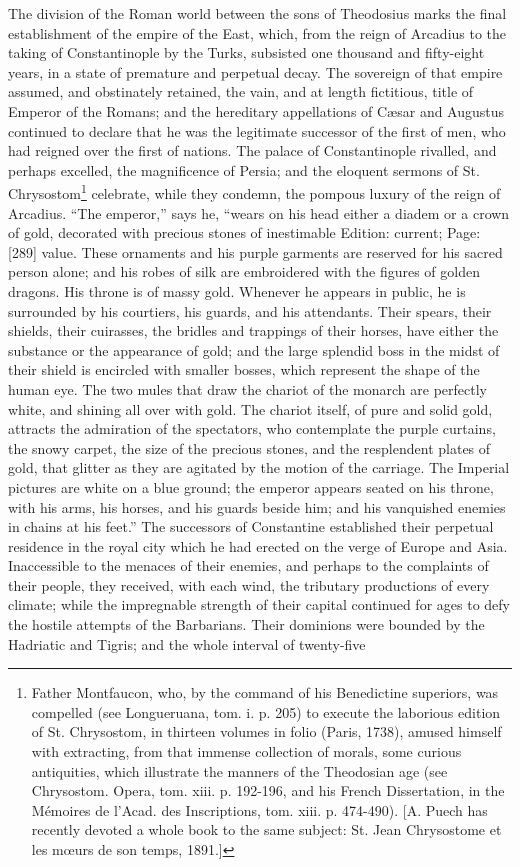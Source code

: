The division of the Roman world between the sons of Theodosius marks the final establishment of the empire of the East, which, from the reign of Arcadius to the taking of Constantinople by the Turks, subsisted one thousand and fifty-eight years, in a state of premature and perpetual decay. The sovereign of that empire assumed, and obstinately retained, the vain, and at length fictitious, title of Emperor of the Romans; and the hereditary appellations of Cæsar and Augustus continued to declare that he was the legitimate successor of the first of men, who had reigned over the first of nations. The palace of Constantinople rivalled, and perhaps excelled, the magnificence of Persia; and the eloquent sermons of St. Chrysostom\footnote{Father Montfaucon, who, by the command of his Benedictine superiors, was compelled (see Longueruana, tom. i. p. 205) to execute the laborious edition of St. Chrysostom, in thirteen volumes in folio (Paris, 1738), amused himself with extracting, from that immense collection of morals, some curious antiquities, which illustrate the manners of the Theodosian age (see Chrysostom. Opera, tom. xiii. p. 192-196, and his French Dissertation, in the Mémoires de l\texthebrew{}’Acad. des Inscriptions, tom. xiii. p. 474-490). [A. Puech has recently devoted a whole book to the same subject: St. Jean Chrysostome et les mœurs de son temps, 1891.]} celebrate, while they condemn, the pompous luxury of the reign of Arcadius. \texthebrew{“}The emperor,\texthebrew{}” says he, \texthebrew{“}wears on his head either a diadem or a crown of gold, decorated with precious stones of inestimable Edition: current; Page: [289] value. These ornaments and his purple garments are reserved for his sacred person alone; and his robes of silk are embroidered with the figures of golden dragons. His throne is of massy gold. Whenever he appears in public, he is surrounded by his courtiers, his guards, and his attendants. Their spears, their shields, their cuirasses, the bridles and trappings of their horses, have either the substance or the appearance of gold; and the large splendid boss in the midst of their shield is encircled with smaller bosses, which represent the shape of the human eye. The two mules that draw the chariot of the monarch are perfectly white, and shining all over with gold. The chariot itself, of pure and solid gold, attracts the admiration of the spectators, who contemplate the purple curtains, the snowy carpet, the size of the precious stones, and the resplendent plates of gold, that glitter as they are agitated by the motion of the carriage. The Imperial pictures are white on a blue ground; the emperor appears seated on his throne, with his arms, his horses, and his guards beside him; and his vanquished enemies in chains at his feet.\texthebrew{}” The successors of Constantine established their perpetual residence in the royal city which he had erected on the verge of Europe and Asia. Inaccessible to the menaces of their enemies, and perhaps to the complaints of their people, they received, with each wind, the tributary productions of every climate; while the impregnable strength of their capital continued for ages to defy the hostile attempts of the Barbarians. Their dominions were bounded by the Hadriatic and Tigris; and the whole interval of twenty-five 